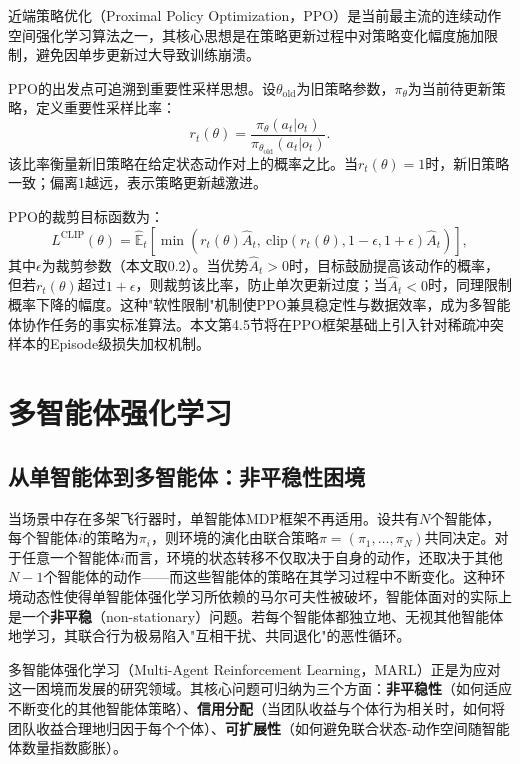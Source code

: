 \documentclass[12pt,a4paper,UTF8]{ctexbook}
\begin{document}
近端策略优化（Proximal Policy Optimization，PPO）\cite{ref30}是当前最主流的连续动作空间强化学习算法之一，其核心思想是在策略更新过程中对策略变化幅度施加限制，避免因单步更新过大导致训练崩溃。

PPO的出发点可追溯到重要性采样思想。设$\theta_{\text{old}}$为旧策略参数，$\pi_\theta$为当前待更新策略，定义重要性采样比率：
\begin{equation}
    r_t(\theta) = \frac{\pi_\theta(a_t|o_t)}{\pi_{\theta_{\text{old}}}(a_t|o_t)}.
    \label{eq:is_ratio}
\end{equation}
该比率衡量新旧策略在给定状态动作对上的概率之比。当$r_t(\theta)=1$时，新旧策略一致；偏离1越远，表示策略更新越激进。

PPO的裁剪目标函数为：
\begin{equation}
    L^{\text{CLIP}}(\theta) = \hat{\mathbb{E}}_t\!\left[\min\!\left(r_t(\theta)\hat{A}_t,\ \text{clip}(r_t(\theta),1-\epsilon,1+\epsilon)\hat{A}_t\right)\right],
    \label{eq:ppo_clip}
\end{equation}
其中$\epsilon$为裁剪参数（本文取0.2）。当优势$\hat{A}_t>0$时，目标鼓励提高该动作的概率，但若$r_t(\theta)$超过$1+\epsilon$，则裁剪该比率，防止单次更新过度；当$\hat{A}_t<0$时，同理限制概率下降的幅度。这种"软性限制"机制使PPO兼具稳定性与数据效率，成为多智能体协作任务的事实标准算法。本文第4.5节将在PPO框架基础上引入针对稀疏冲突样本的Episode级损失加权机制。

\section{多智能体强化学习}

\subsection{从单智能体到多智能体：非平稳性困境}

当场景中存在多架飞行器时，单智能体MDP框架不再适用。设共有$N$个智能体，每个智能体$i$的策略为$\pi_i$，则环境的演化由联合策略$\pi=(\pi_1,\ldots,\pi_N)$共同决定。对于任意一个智能体$i$而言，环境的状态转移不仅取决于自身的动作，还取决于其他$N-1$个智能体的动作——而这些智能体的策略在其学习过程中不断变化。这种环境动态性使得单智能体强化学习所依赖的马尔可夫性被破坏，智能体面对的实际上是一个\textbf{非平稳}（non-stationary）问题。若每个智能体都独立地、无视其他智能体地学习，其联合行为极易陷入"互相干扰、共同退化"的恶性循环。

多智能体强化学习（Multi-Agent Reinforcement Learning，MARL）正是为应对这一困境而发展的研究领域。其核心问题可归纳为三个方面：\textbf{非平稳性}（如何适应不断变化的其他智能体策略）、\textbf{信用分配}（当团队收益与个体行为相关时，如何将团队收益合理地归因于每个个体）、\textbf{可扩展性}（如何避免联合状态-动作空间随智能体数量指数膨胀）。
\end{document}
